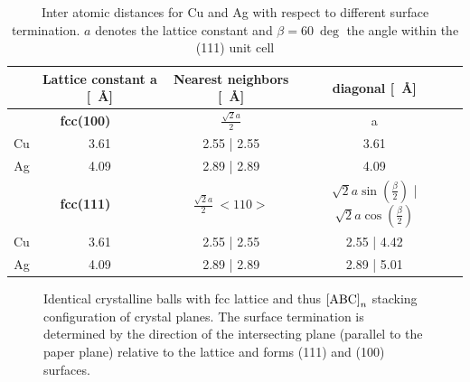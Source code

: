 \begin{table}
\centering {}
\caption{Inter atomic distances for Cu and Ag with respect to different surface termination. $a$ denotes the lattice constant and $\beta= \SI{60}{\deg}$ the angle within the (111) unit cell}
\label{tab:lattice-constants}
  \begin{tabular}{ccccc}
& Lattice constant a [\SI{}{\angstrom}] & Nearest neighbors [\SI{}{\angstrom}] & diagonal [\SI{}{\angstrom}]\\ \hline 
\multicolumn{2}{c}{\textbf{fcc(100)}} & $\frac{\sqrt{2}a}{2}$ & a \\
  Cu	 	& 3.61	& 2.55 | 2.55 & 3.61  \\
  Ag		& 4.09	& 2.89 | 2.89 & 4.09 \\ \hline 
\multicolumn{2}{c}{\textbf{fcc(111)}} & $\frac{\sqrt{2}a}{2} \ <110>$ & $\sqrt{2}a\sin(\frac{\beta}{2})$ | $\sqrt{2}a\cos(\frac{\beta}{2})$\\
Cu 		& 3.61	& 2.55 | 2.55	& 2.55 | 4.42 \\
Ag		& 4.09	& 2.89 | 2.89	& 2.89 | 5.01 \\ \hline
 \end{tabular}
\end{table}

\begin{figure}\centering
	 \quad
	\caption{Identical crystalline balls with fcc lattice and thus $\textnormal{[ABC]}_n$ stacking configuration of crystal planes. The surface termination is determined by the direction of the intersecting plane (parallel to the paper plane) relative to the lattice and forms (111) and (100) surfaces.}
	\label{fig:crystal-termination}
\end{figure}

